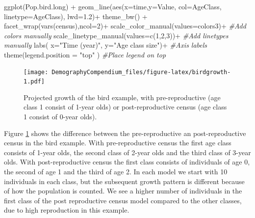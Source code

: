 \documentclass[
]{book}
\newenvironment{Shaded}{\begin{snugshade}}{\end{snugshade}}
\newcommand{\AttributeTok}[1]{\textcolor[rgb]{0.77,0.63,0.00}{#1}}
\newcommand{\CommentTok}[1]{\textcolor[rgb]{0.56,0.35,0.01}{\textit{#1}}}
\newcommand{\DecValTok}[1]{\textcolor[rgb]{0.00,0.00,0.81}{#1}}
\newcommand{\FloatTok}[1]{\textcolor[rgb]{0.00,0.00,0.81}{#1}}
\newcommand{\FunctionTok}[1]{\textcolor[rgb]{0.00,0.00,0.00}{#1}}
\newcommand{\NormalTok}[1]{#1}
\newcommand{\SpecialCharTok}[1]{\textcolor[rgb]{0.00,0.00,0.00}{#1}}
\newcommand{\StringTok}[1]{\textcolor[rgb]{0.31,0.60,0.02}{#1}}
\begin{document}
\begin{Shaded}
\begin{Highlighting}[]
\FunctionTok{ggplot}\NormalTok{(Pop.bird.long) }\SpecialCharTok{+} 
  \FunctionTok{geom\_line}\NormalTok{(}\FunctionTok{aes}\NormalTok{(}\AttributeTok{x=}\NormalTok{time,}\AttributeTok{y=}\NormalTok{Value, }\AttributeTok{col=}\NormalTok{AgeClass, }\AttributeTok{linetype=}\NormalTok{AgeClass), }\AttributeTok{lwd=}\FloatTok{1.2}\NormalTok{)}\SpecialCharTok{+}
  \FunctionTok{theme\_bw}\NormalTok{() }\SpecialCharTok{+}
  \FunctionTok{facet\_wrap}\NormalTok{(}\FunctionTok{vars}\NormalTok{(census),}\AttributeTok{ncol=}\DecValTok{2}\NormalTok{)}\SpecialCharTok{+}
  \FunctionTok{scale\_color\_manual}\NormalTok{(}\AttributeTok{values=}\NormalTok{colors3)}\SpecialCharTok{+} \CommentTok{\#Add colors manually}
  \FunctionTok{scale\_linetype\_manual}\NormalTok{(}\AttributeTok{values=}\FunctionTok{c}\NormalTok{(}\DecValTok{1}\NormalTok{,}\DecValTok{2}\NormalTok{,}\DecValTok{3}\NormalTok{))}\SpecialCharTok{+} \CommentTok{\#Add linetypes manually}
  \FunctionTok{labs}\NormalTok{( }\AttributeTok{x=}\StringTok{"Time (year)"}\NormalTok{, }\AttributeTok{y=}\StringTok{"Age class size"}\NormalTok{)}\SpecialCharTok{+} \CommentTok{\#Axis labels}
  \FunctionTok{theme}\NormalTok{(}\AttributeTok{legend.position =} \StringTok{"top"}\NormalTok{ ) }\CommentTok{\#Place legend on top}
\end{Highlighting}
\end{Shaded}

\begin{figure}
\centering
\texttt{[image: DemographyCompendium\_files/figure-latex/birdgrowth-1.pdf]}
\caption{\label{fig:birdgrowth}Projected growth of the bird example, with pre-reproductive (age class 1 consist of 1-year olds) or post-reproductive census (age class 1 consist of 0-year olds).}
\end{figure}

Figure \ref{fig:birdgrowth} shows the difference between the pre-reproductive an post-reproductive census in the bird example. With pre-reproductive census the first age class consists of 1-year olds, the second class of 2-year olds and the third class of 3-year olds. With post-reproductive census the first class consists of individuals of age 0, the second of age 1 and the third of age 2. In each model we start with 10 individuals in each class, but the subsequent growth pattern is different because of how the population is counted. We see a higher number of individuals in the first class of the post reproductive census model compared to the other classes, due to high reproduction in this example.
\end{document}
